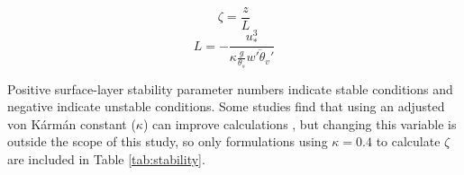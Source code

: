 \begin{equation}\label{eq:zl}
\zeta = \frac{z}{L}
\end{equation}
\begin{equation}\label{eq:l}
L = -\frac{u_{*}^{3}}{\kappa \frac{g}{\theta_{s}} \overline{w'\theta_{v}'}}
\end{equation} 

Positive surface-layer stability parameter numbers indicate stable conditions and negative indicate unstable conditions. Some studies find that using an adjusted von K\'{a}rm\'{a}n constant ($\kappa$) can improve calculations \citep{businger:1971, zilitinkevitsch:1968, dyer:1970, foken:2008}, but changing this variable is outside the scope of this study, so only formulations using $\kappa = 0.4$ to calculate $\zeta$ are included in Table \ref{tab:stability}. 

